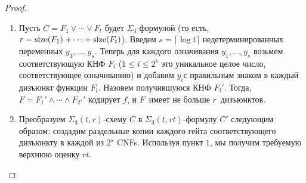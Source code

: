 \begin{proof}
	\begin{enumerate}
		\item Пусть $C=F_1 \lor \dotsb \lor F_{t}$ будет $\Sigma_3$-формулой (то есть, $r=\operatorname{size}(F_1)+\dotsb+\operatorname{size}(F_{t})$). Введем $s=\lceil\log t\rceil$ недетерминированных переменных $y_1, \dotsc, y_s$. 
		Теперь для каждого означивания $y_1, \dotsc, y_s$ возьмем соответствующую КНФ $F_i$ ($1 \le i \le 2^s$ это уникальное целое число, соответствующее означиванию) и добавим
		$y_i$с правильным знаком в каждый дизъюнкт функции $F_i$.
		Назовем получившуюся КНФ $F_i'$. Тогда, $F=F_1'\land \dotsb \land F_{2^s}'$ кодирует $f$, и $F$~имеет не больше $r$~дизъюнктов.

		\item Преобразуем $\Sigma_3(t,r)$-схему $C$ в $\Sigma_3(t,rt)$-формулу $C'$ следующим образом:
		создадим раздельные копии каждого гейта соответствующего дизъюнкту в каждой из $2^s$ CNFs. Используя пункт $1$, мы получим требуемую верхнюю оценку $rt$.

	\end{enumerate}
	
	
	
\end{proof}
